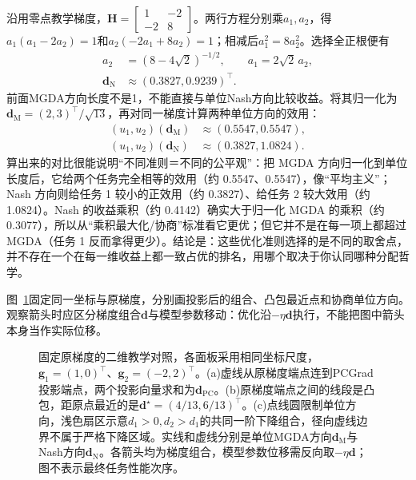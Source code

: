 沿用零点教学梯度，$\bm H=\left[\begin{smallmatrix}1&-2\\-2&8\end{smallmatrix}\right]$。两行方程分别乘$a_1,a_2$，得$a_1(a_1-2a_2)=1$和$a_2(-2a_1+8a_2)=1$；相减后$a_1^2=8a_2^2$。选择全正根便有
\begin{align}
  a_2&=(8-4\sqrt2)^{-1/2},
  \qquad a_1=2\sqrt2\,a_2,
  \nonumber\\
  \bm d_{\mathrm N}&\approx(0.3827,0.9239)^{\top}.
\end{align}
前面MGDA方向长度不是1，不能直接与单位Nash方向比较收益。将其归一化为$\bm d_{\mathrm M}=(2,3)^{\top}/\sqrt{13}$，再对同一梯度计算两种单位方向的效用：
\begin{align}
  (u_1,u_2)(\bm d_{\mathrm M})
    &\approx(0.5547,0.5547),
  \nonumber\\
  (u_1,u_2)(\bm d_{\mathrm N})
    &\approx(0.3827,1.0824).
  \label{eq:ket-sharing-nash-numbers}
\end{align}
算出来的对比很能说明“不同准则＝不同的公平观”：把 MGDA 方向归一化到单位长度后，它给两个任务完全相等的效用（约 0.5547、0.5547），像“平均主义”；Nash 方向则给任务 1 较小的正效用（约 0.3827）、给任务 2 较大效用（约 1.0824）。Nash 的收益乘积（约 0.4142）确实大于归一化 MGDA 的乘积（约 0.3077），所以从“乘积最大化/协商”标准看它更优；但它并不是在每一项上都超过 MGDA（任务 1 反而拿得更少）。结论是：这些优化准则选择的是不同的取舍点，并不存在一个在每一维收益上都一致占优的排名，用哪个取决于你认同哪种分配哲学。

图~\ref{fig:ket-sharing-gradient-geometry}固定同一坐标与原梯度，分别画投影后的组合、凸包最近点和协商单位方向。观察箭头时应区分梯度组合$\bm d$与模型参数移动：优化沿$-\eta\bm d$执行，不能把图中箭头本身当作实际位移。

\begin{figure}[htbp]
  \centering
  
  \caption{固定原梯度的二维教学对照，各面板采用相同坐标尺度，$\bm g_1=(1,0)^{\top}$、$\bm g_2=(-2,2)^{\top}$。(a)虚线从原梯度端点连到PCGrad投影端点，两个投影向量求和为$\bm d_{\mathrm{PC}}$。(b)原梯度端点之间的线段是凸包，距原点最近的是$\bm d^\star=(4/13,6/13)^{\top}$。(c)点线圆限制单位方向，浅色扇区示意$d_1>0,d_2>d_1$的共同一阶下降组合，径向虚线边界不属于严格下降区域。实线和虚线分别是单位MGDA方向$\bm d_{\mathrm M}$与Nash方向$\bm d_{\mathrm N}$。各箭头均为梯度组合，模型参数位移需反向取$-\eta\bm d$；图不表示最终任务性能次序。}
  \label{fig:ket-sharing-gradient-geometry}
\end{figure}
\FloatBarrier

